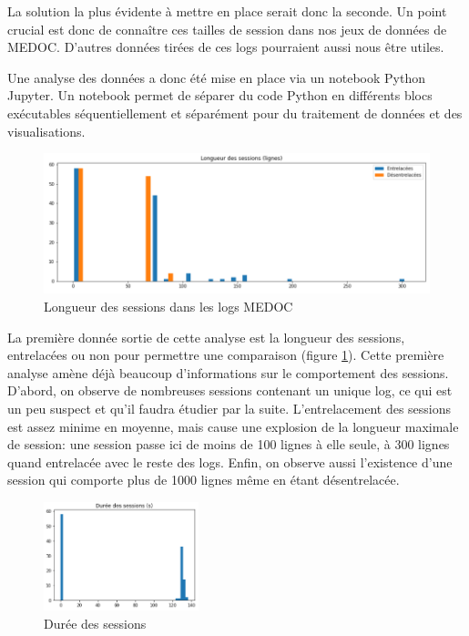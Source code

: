 \documentclass[openany, 11pt]{memoir}
\begin{document}
La solution la plus évidente à mettre en place serait donc la seconde. Un point crucial est donc de connaître ces tailles de session dans nos jeux de données de \gls{MEDOC}. D'autres données tirées de ces \glspl{log} pourraient aussi nous être utiles.

\bigskip
Une analyse des données a donc été mise en place via un notebook Python Jupyter. Un notebook permet de séparer du code Python en différents blocs exécutables séquentiellement et séparément pour du traitement de données et des visualisations.

\begin{figure}[ht]
	\centering
	\includegraphics[width=\textwidth]{images/longsess.png}
	\caption{Longueur des sessions dans les logs MEDOC}
	\label{longsess}
\end{figure}

La première donnée sortie de cette analyse est la longueur des sessions, entrelacées ou non pour permettre une comparaison (figure \ref{longsess}). Cette première analyse amène déjà beaucoup d'informations sur le comportement des sessions. D'abord, on observe de nombreuses sessions contenant un unique \gls{log}, ce qui est un peu suspect et qu'il faudra étudier par la suite. L'entrelacement des sessions est assez minime en moyenne, mais cause une explosion de la longueur maximale de session: une session passe ici de moins de 100 lignes à elle seule, à 300 lignes quand entrelacée avec le reste des logs. Enfin, on observe aussi l'existence d'une session qui comporte plus de 1000 lignes même en étant désentrelacée.

\begin{figure}[ht]
	\centering
	\includegraphics[width=0.4\textwidth]{images/dureesess.png}
	\caption{Durée des sessions}
	\label{dureesess}
\end{figure}
\end{document}
